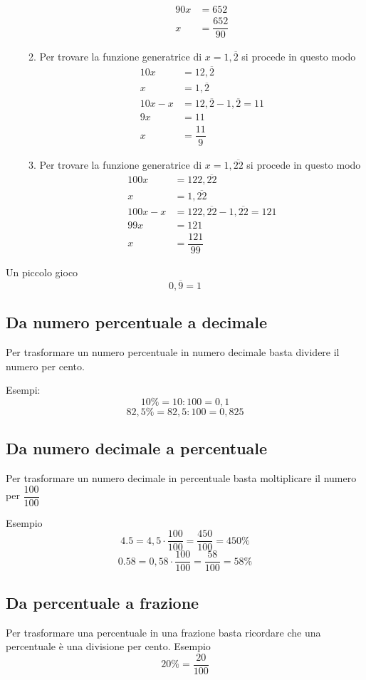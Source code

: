 \begin{enumerate}
\begin{enumerate}
\begin{align*}
		90x&=652\\
		x&=\dfrac{652}{90}
		\end{align*}
		\item Per trovare la funzione generatrice di $x=1{,}\overline{2}$ si procede in questo modo
		\begin{align*}
		10x &=12{,}\overline{2}\\
		x &=1{,}\overline{2}\\
		10x-x&=12{,}\overline{2}-1{,}\overline{2}=11\\
		9x&=11\\
		x&=\dfrac{11}{9}
		\end{align*}
		\item Per trovare la funzione generatrice di $x=1{,}\overline{22}$ si procede in questo modo
		\begin{align*}
		100x &=122{,}\overline{22}\\
		x &=1{,}\overline{22}\\
		100x-x&=122{,}\overline{22}-1{,}\overline{22}=121\\
		99x&=121\\
		x&=\dfrac{121}{99}
		\end{align*}
	\end{enumerate}
	
\end{enumerate}
Un piccolo gioco 
\[0{,}\overline{9}=1\]
\subsection{Da numero percentuale a decimale}
Per trasformare un numero percentuale in numero decimale basta dividere il numero per cento. 

Esempi:\[10\%= 10:100=0,1 \] \[82,5\%= 82,5:100=0,825 \]
\subsection{Da numero decimale a percentuale}
Per trasformare un numero decimale in percentuale basta moltiplicare il numero per $\dfrac{100}{100}$

Esempio \[\num{4,5}=4,5\cdot\dfrac{100}{100}=\dfrac{450}{100}=450\%\]
\[\num{0,58}=0{,}58\cdot\dfrac{100}{100}=\dfrac{58}{100}=58\%\]
\subsection{Da percentuale a frazione}
Per trasformare una percentuale in una frazione basta ricordare che una percentuale è una divisione per cento.
Esempio
\[20\%=\dfrac{20}{100} \]
